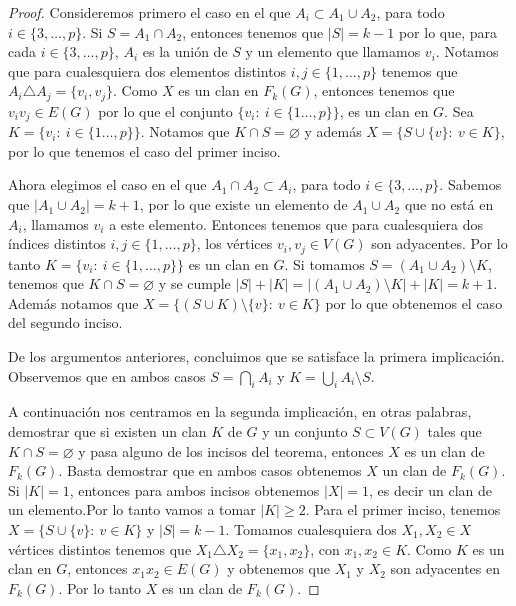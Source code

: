 \begin{proof}
        Consideremos primero el caso en el que $A_i \subset A_1\cup A_2$, para
        todo $i\in \{3, \dots, p\}$. Si $S= A_1 \cap A_2$, entonces tenemos que
        $|S| =k-1$ por lo que, para cada $i \in \{3, \dots, p\}$, $A_i$ es la
        uni\'on de $S$ y un elemento que llamamos $v_i$. Notamos que para
        cualesquiera dos elementos distintos $i, j \in \{1, \dots, p\}$ tenemos
        que $A_i \triangle A_j = \{v_i, v_j\}$. Como $X$ es un clan en $F_k(G)$,
        entonces tenemos que $v_i{v_j} \in E(G)$ por lo que el conjunto
        $\{v_i\colon\ i \in \{1 \dots, p\}\}$, es un clan en $G$.   Sea $K =
        \{v_i\colon\ i \in \{1 \dots, p\}\}$.  Notamos que  $K \cap S = \varnothing$ y
        adem\'as $X= \{S \cup \{v\}\colon\ v \in K\}$, por lo que tenemos el caso del
        primer inciso.

        Ahora elegimos el caso en el que $A_1 \cap A_2 \subset A_i$, para todo
        $i\in \{3, \dots, p\}$. Sabemos que $|A_1 \cup A_2| = k+1$, por lo que
        existe un elemento de $A_1 \cup A_2$ que no est\'a en $A_i$, llamamos
        $v_i$ a este elemento. Entonces tenemos que para cualesquiera dos
        \'indices distintos $i, j \in \{1, \dots, p\}$, los v\'ertices $v_i, v_j
        \in V(G)$ son adyacentes. Por lo tanto $K= \{v_i\colon\ i \in \{1, \dots,
        p\}\}$ es un clan en $G$. Si tomamos $S= (A_1 \cup A_2)\setminus K$,
        tenemos que $K \cap S = \varnothing$ y se cumple $|S| + |K|= |(A_1 \cup
        A_2)\setminus K| + |K| = k+1$. Adem\'as notamos que $X = \{(S \cup
        K)\setminus \{v\}\colon\ v\in K\}$ por lo que obtenemos el caso del segundo
        inciso.

        De los argumentos anteriores, concluimos que se satisface la primera
        implicaci\'on. Observemos que en ambos casos $S = \bigcap\limits_{i}
        A_i$ y $K = \bigcup\limits_{i} A_i \setminus S$.
        
        A continuaci\'on nos centramos en la segunda implicaci\'on, en otras
        palabras, demostrar que si existen un clan $K$ de $G$ y un conjunto $S
        \subset V(G)$ tales que $K \cap S = \varnothing$ y pasa alguno de los
        incisos del teorema, entonces $X$ es un clan de $F_k(G)$. Basta
        demostrar que en ambos casos obtenemos $X$ un clan de $F_k(G)$. Si $|K|
        =1$, entonces para ambos incisos obtenemos $|X| =1$, es decir un clan de
        un elemento.Por lo tanto vamos a tomar $|K| \geq 2$. Para el primer
        inciso, tenemos $X = \{S \cup \{v\}\colon\ v \in K\}$ y $|S| = k-1$. Tomamos
        cualesquiera dos $X_1, X_2 \in X$ v\'ertices distintos tenemos que $X_1
        \triangle X_2 =\{x_1, x_2\}$, con $x_1, x_2 \in K$. Como $K$ es un clan
        en $G$, entonces $x_1x_2 \in E(G)$ y obtenemos que $X_1$ y $X_2$ son
        adyacentes en $F_k(G)$. Por lo tanto $X$ es un clan de $F_k(G)$.


\end{proof}
